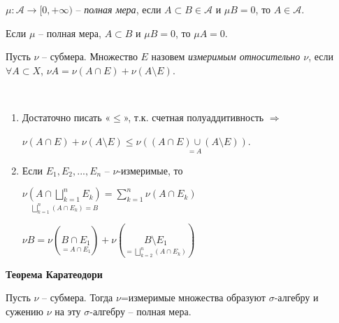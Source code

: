 \begin{definition}
    $\mu: \mathcal{A}\rightarrow [0, +\infty)$ – \textit{полная мера}, если $A\subset B \in \mathcal{A}$ и $\mu B=0$, 
    то $A\in \mathcal{A}$.
\end{definition}

\begin{remark}
    Если $\mu$ – полная мера, $A\subset B$ и $\mu B = 0$, то $\mu A = 0$.
\end{remark}

\begin{definition}
    Пусть $\nu$ – субмера. Множество $E$ назовем \textit{измеримым относительно $\nu$}, если $\forall A\subset X$, $\nu A = \nu (A\cap E) + \nu (A\setminus E)$.
\end{definition}

\begin{remark}~
    \begin{enumerate}
        \item Достаточно писать «$\leq$», т.к. счетная полуаддитивность $\Rightarrow $
        
        $\nu (A\cap E) + \nu (A\setminus E)\leq \nu \underset{=A}{((A\cap E) \cup (A\setminus E))}$.
        \item Если $E_1, E_2, ..., E_n$ – $\nu$-измеримые, то 
        
        $\nu \underset{\bigsqcup\limits_{k=1}^n(A\cap E_k)=B}{(A\cap \bigsqcup\limits_{k=1}^n E_k)}=\sum\limits_{k=1}^n \nu (A\cap E_k)$

        $\nu B = \nu (\underset{=A\cap E_1}{B\cap E_1})+ \nu (\underset{=\bigsqcup\limits_{k=2}^n(A\cap E_k)}{B\setminus E_1})$
    \end{enumerate}
\end{remark}

\begin{theorem}
    \textbf{Теорема Каратеодори}

    Пусть $\nu$ – субмера. Тогда $\nu$=измеримые множества образуют $\sigma$-алгебру и сужению $\nu$ на эту 
    $\sigma$-алгебру – полная мера.
\end{theorem}

